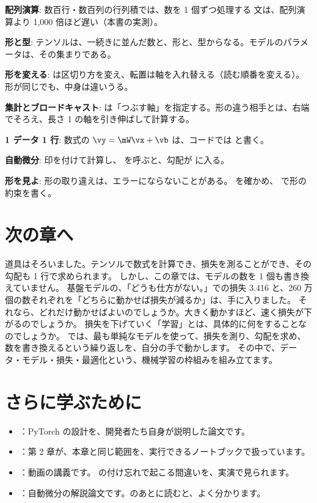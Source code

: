 \begin{summary}
\item \textbf{配列演算}: 数百行・数百列の行列積では、数を 1 個ずつ処理する  文は、配列演算より 1,000 倍ほど遅い（本書の実測）。
\item \textbf{形と型}: テンソルは、一続きに並んだ数と、形と、型からなる。モデルのパラメータは、その集まりである。
\item \textbf{形を変える}:  は区切り方を変え、転置は軸を入れ替える（読む順番を変える）。形が同じでも、中身は違いうる。
\item \textbf{集計とブロードキャスト}:  は「つぶす軸」を指定する。形の違う相手とは、右端でそろえ、長さ 1 の軸を引き伸ばして計算する。
\item \textbf{1 データ 1 行}: 数式の $\vy=\mW\vx+\vb$ は、コードでは  と書く。
\item \textbf{自動微分}: 印を付けて計算し、 を呼ぶと、勾配が  に入る。
\item \textbf{形を見よ}: 形の取り違えは、エラーにならないことがある。 を確かめ、 で形の約束を書く。
\end{summary}

\section*{次の章へ}

道具はそろいました。テンソルで数式を計算でき、損失を測ることができ、その勾配も 1 行で求められます。
しかし、この章では、モデルの数を 1 個も書き換えていません。
基盤モデルの、「どうも仕方がない。」での損失 3.416 と、260 万個の数それぞれを「どちらに動かせば損失が減るか」は、手に入りました。
それなら、どれだけ動かせばよいのでしょうか。大きく動かすほど、速く損失が下がるのでしょうか。
損失を下げていく「学習」とは、具体的に何をすることなのでしょうか。
では、最も単純なモデルを使って、損失を測り、勾配を求め、数を書き換えるという繰り返しを、自分の手で動かします。
その中で、データ・モデル・損失・最適化という、機械学習の枠組みを組み立てます。

\section*{さらに学ぶために}

\begin{itemize}
\item \cite{paszke2019pytorch}：PyTorch の設計を、開発者たち自身が説明した論文です。
\item \cite{zhang2023d2l}：第 2 章が、本章と同じ範囲を、実行できるノートブックで扱っています。
\item \cite{karpathy2022zerotohero}：動画の講義です。 の付け忘れで起こる間違いを、実演で見られます。
\item \cite{baydin2018automatic}：自動微分の解説論文です。のあとに読むと、よく分かります。
\end{itemize}

